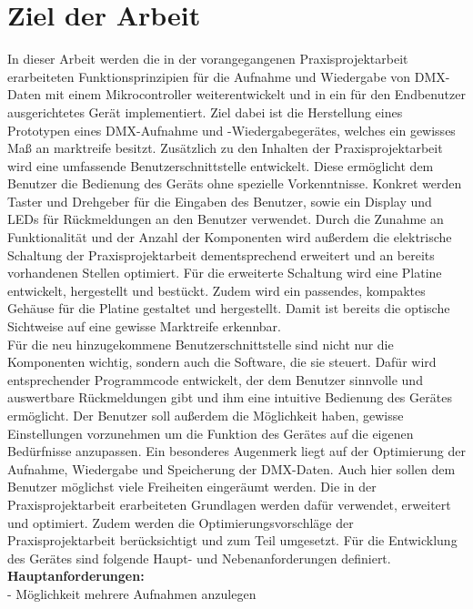 
\newpage
\section{Ziel der Arbeit}
\label{sec:Ziel}
In dieser Arbeit werden die in der vorangegangenen Praxisprojektarbeit erarbeiteten Funktionsprinzipien für die Aufnahme und Wiedergabe von DMX-Daten mit einem Mikrocontroller weiterentwickelt und in ein für den Endbenutzer ausgerichtetes Gerät implementiert. Ziel dabei ist die Herstellung eines Prototypen eines DMX-Aufnahme und -Wiedergabegerätes, welches ein gewisses Maß an marktreife besitzt. Zusätzlich zu den Inhalten der Praxisprojektarbeit wird eine umfassende Benutzerschnittstelle entwickelt. Diese ermöglicht dem Benutzer die Bedienung des Geräts ohne spezielle Vorkenntnisse. Konkret werden Taster und Drehgeber für die Eingaben des Benutzer, sowie ein Display und LEDs für Rückmeldungen an den Benutzer verwendet. Durch die Zunahme an Funktionalität und der Anzahl der Komponenten wird außerdem die elektrische Schaltung der Praxisprojektarbeit dementsprechend erweitert und an bereits vorhandenen Stellen optimiert. Für die erweiterte Schaltung wird eine Platine entwickelt, hergestellt und bestückt. Zudem wird ein passendes, kompaktes Gehäuse für die Platine gestaltet und hergestellt. Damit ist bereits die optische Sichtweise auf eine gewisse Marktreife erkennbar.\\
Für die neu hinzugekommene Benutzerschnittstelle sind nicht nur die Komponenten wichtig, sondern auch die Software, die sie steuert. Dafür wird entsprechender Programmcode entwickelt, der dem Benutzer sinnvolle und auswertbare Rückmeldungen gibt und ihm eine intuitive Bedienung des Gerätes ermöglicht. Der Benutzer soll außerdem die Möglichkeit haben, gewisse Einstellungen vorzunehmen um die Funktion des Gerätes auf die eigenen Bedürfnisse anzupassen. Ein besonderes Augenmerk liegt auf der Optimierung der Aufnahme, Wiedergabe und Speicherung der DMX-Daten. Auch hier sollen dem Benutzer möglichst viele Freiheiten eingeräumt werden. Die in der Praxisprojektarbeit erarbeiteten Grundlagen werden dafür verwendet, erweitert und optimiert. Zudem werden die Optimierungsvorschläge der Praxisprojektarbeit berücksichtigt und zum Teil umgesetzt. Für die Entwicklung des Gerätes sind folgende Haupt- und Nebenanforderungen definiert.\\
\newline
\textbf{Hauptanforderungen:}\\
- Möglichkeit mehrere Aufnahmen anzulegen\\
